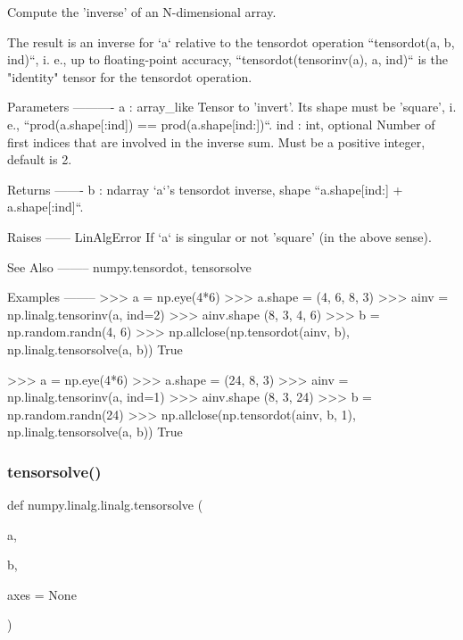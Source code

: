 \begin{DoxyVerb}Compute the 'inverse' of an N-dimensional array.

The result is an inverse for `a` relative to the tensordot operation
``tensordot(a, b, ind)``, i. e., up to floating-point accuracy,
``tensordot(tensorinv(a), a, ind)`` is the "identity" tensor for the
tensordot operation.

Parameters
----------
a : array_like
    Tensor to 'invert'. Its shape must be 'square', i. e.,
    ``prod(a.shape[:ind]) == prod(a.shape[ind:])``.
ind : int, optional
    Number of first indices that are involved in the inverse sum.
    Must be a positive integer, default is 2.

Returns
-------
b : ndarray
    `a`'s tensordot inverse, shape ``a.shape[ind:] + a.shape[:ind]``.

Raises
------
LinAlgError
    If `a` is singular or not 'square' (in the above sense).

See Also
--------
numpy.tensordot, tensorsolve

Examples
--------
>>> a = np.eye(4*6)
>>> a.shape = (4, 6, 8, 3)
>>> ainv = np.linalg.tensorinv(a, ind=2)
>>> ainv.shape
(8, 3, 4, 6)
>>> b = np.random.randn(4, 6)
>>> np.allclose(np.tensordot(ainv, b), np.linalg.tensorsolve(a, b))
True

>>> a = np.eye(4*6)
>>> a.shape = (24, 8, 3)
>>> ainv = np.linalg.tensorinv(a, ind=1)
>>> ainv.shape
(8, 3, 24)
>>> b = np.random.randn(24)
>>> np.allclose(np.tensordot(ainv, b, 1), np.linalg.tensorsolve(a, b))
True\end{DoxyVerb}
 \mbox{\label{namespacenumpy_1_1linalg_1_1linalg_a222c2c14f5480184b180a2d4da5a78b9}} 
\subsubsection{\texorpdfstring{tensorsolve()}{tensorsolve()}}
{\footnotesize\ttfamily def numpy.\+linalg.\+linalg.\+tensorsolve (\begin{DoxyParamCaption}\item[{}]{a,  }\item[{}]{b,  }\item[{}]{axes = {\ttfamily None} }\end{DoxyParamCaption})}

